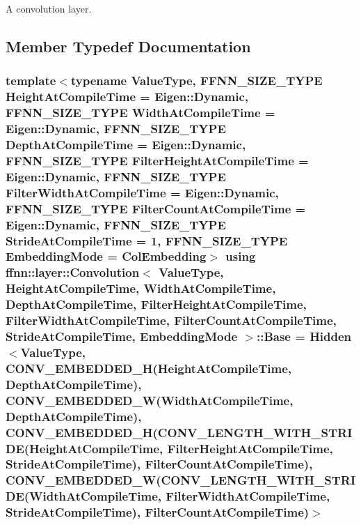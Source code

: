 A convolution layer. 

\subsection{Member Typedef Documentation}
\hypertarget{classffnn_1_1layer_1_1_convolution_a0c1ce0c94acedcfce2cc663262928c78}{
\subsubsection[{Base}]{\setlength{\rightskip}{0pt plus 5cm}template$<$typename Value\-Type, F\-F\-N\-N\-\_\-\-S\-I\-Z\-E\-\_\-\-T\-Y\-P\-E Height\-At\-Compile\-Time = Eigen\-::\-Dynamic, F\-F\-N\-N\-\_\-\-S\-I\-Z\-E\-\_\-\-T\-Y\-P\-E Width\-At\-Compile\-Time = Eigen\-::\-Dynamic, F\-F\-N\-N\-\_\-\-S\-I\-Z\-E\-\_\-\-T\-Y\-P\-E Depth\-At\-Compile\-Time = Eigen\-::\-Dynamic, F\-F\-N\-N\-\_\-\-S\-I\-Z\-E\-\_\-\-T\-Y\-P\-E Filter\-Height\-At\-Compile\-Time = Eigen\-::\-Dynamic, F\-F\-N\-N\-\_\-\-S\-I\-Z\-E\-\_\-\-T\-Y\-P\-E Filter\-Width\-At\-Compile\-Time = Eigen\-::\-Dynamic, F\-F\-N\-N\-\_\-\-S\-I\-Z\-E\-\_\-\-T\-Y\-P\-E Filter\-Count\-At\-Compile\-Time = Eigen\-::\-Dynamic, F\-F\-N\-N\-\_\-\-S\-I\-Z\-E\-\_\-\-T\-Y\-P\-E Stride\-At\-Compile\-Time = 1, F\-F\-N\-N\-\_\-\-S\-I\-Z\-E\-\_\-\-T\-Y\-P\-E Embedding\-Mode = Col\-Embedding$>$ using {\bf ffnn\-::layer\-::\-Convolution}$<$ Value\-Type, Height\-At\-Compile\-Time, Width\-At\-Compile\-Time, Depth\-At\-Compile\-Time, Filter\-Height\-At\-Compile\-Time, Filter\-Width\-At\-Compile\-Time, Filter\-Count\-At\-Compile\-Time, Stride\-At\-Compile\-Time, {\bf Embedding\-Mode} $>$\-::{\bf Base} =  {\bf Hidden}$<$Value\-Type, {\bf C\-O\-N\-V\-\_\-\-E\-M\-B\-E\-D\-D\-E\-D\-\_\-\-H}(Height\-At\-Compile\-Time, Depth\-At\-Compile\-Time), {\bf C\-O\-N\-V\-\_\-\-E\-M\-B\-E\-D\-D\-E\-D\-\_\-\-W}(Width\-At\-Compile\-Time, Depth\-At\-Compile\-Time), {\bf C\-O\-N\-V\-\_\-\-E\-M\-B\-E\-D\-D\-E\-D\-\_\-\-H}({\bf C\-O\-N\-V\-\_\-\-L\-E\-N\-G\-T\-H\-\_\-\-W\-I\-T\-H\-\_\-\-S\-T\-R\-I\-D\-E}(Height\-At\-Compile\-Time, Filter\-Height\-At\-Compile\-Time, Stride\-At\-Compile\-Time), Filter\-Count\-At\-Compile\-Time), {\bf C\-O\-N\-V\-\_\-\-E\-M\-B\-E\-D\-D\-E\-D\-\_\-\-W}({\bf C\-O\-N\-V\-\_\-\-L\-E\-N\-G\-T\-H\-\_\-\-W\-I\-T\-H\-\_\-\-S\-T\-R\-I\-D\-E}(Width\-At\-Compile\-Time, Filter\-Width\-At\-Compile\-Time, Stride\-At\-Compile\-Time), Filter\-Count\-At\-Compile\-Time)$>$}}\label{classffnn_1_1layer_1_1_convolution_a0c1ce0c94acedcfce2cc663262928c78}


